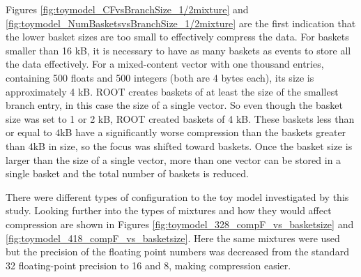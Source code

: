 Figures \ref{fig:toymodel_CFvsBranchSize_1/2mixture} and \ref{fig:toymodel_NumBasketsvsBranchSize_1/2mixture} are the first indication that the lower basket sizes are too small to effectively compress the data. 
For baskets smaller than 16 kB, it is necessary to have as many baskets as events to store all the data effectively.
For a mixed-content vector with one thousand entries, containing 500 floats and 500 integers (both are 4 bytes each), its size is approximately 4 kB.
ROOT creates baskets of at least the size of the smallest branch entry, in this case the size of a single vector.
So even though the basket size was set to 1 or 2 kB, ROOT created baskets of 4 kB.
These baskets less than or equal to $4$kB have a significantly worse compression than the baskets greater than $4$kB in size, so the focus was shifted toward baskets.  
Once the basket size is larger than the size of a single vector, more than one vector can be stored in a single basket and the total number of baskets is reduced.

There were different types of configuration to the toy model investigated by this study. 
Looking further into the types of mixtures and how they would affect compression are shown in Figures \ref{fig:toymodel_328_compF_vs_basketsize} and \ref{fig:toymodel_418_compF_vs_basketsize}. 
Here the same mixtures were used but the precision of the floating point numbers was decreased from the standard 32 floating-point precision to 16 and 8, making compression easier. 

